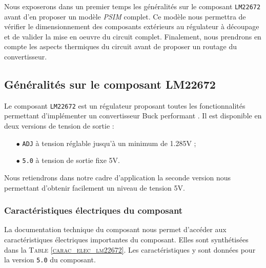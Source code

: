 	Nous exposerons dans un premier temps les généralités sur le composant
	\texttt{LM22672} avant d'en proposer un modèle \textit{PSIM} complet. 
	Ce modèle nous permettra de vérifier le dimensionnement des composants
	extérieurs au régulateur à découpage et de valider la mise en oeuvre
	du circuit complet. Finalement, nous prendrons en compte les aspects
	thermiques du circuit avant de proposer un routage du convertisseur.
			
		\subsection{Généralités sur le composant LM22672}
		
		Le composant \texttt{LM22672} est un régulateur proposant toutes 
		les fonctionnalités permettant d'implémenter un convertisseur 
		Buck performant \cite{LM22672}. Il est disponible en deux versions 
		de tension de sortie :
		\begin{itemize}
			\item[$\bullet$]	\texttt{ADJ} à tension réglable jusqu'à un minimum
							 	de 1.285V ;
			\item[$\bullet$]	\texttt{5.0} à tension de sortie fixe 5V.			 
		\end{itemize}
		Nous retiendrons dans notre cadre d'application la seconde version
		nous permettant d'obtenir facilement un niveau de tension 5V.
			
			\subsubsection{Caractéristiques électriques du composant}
			
			La documentation technique du composant nous permet d'accéder aux
			caractéristiques électriques importantes du composant. Elles sont
			synthétisées dans la \textsc{Table \ref{carac_elec_lm22672}}.
			Les caractéristiques y sont données pour la version \texttt{5.0}
			du composant.
			
